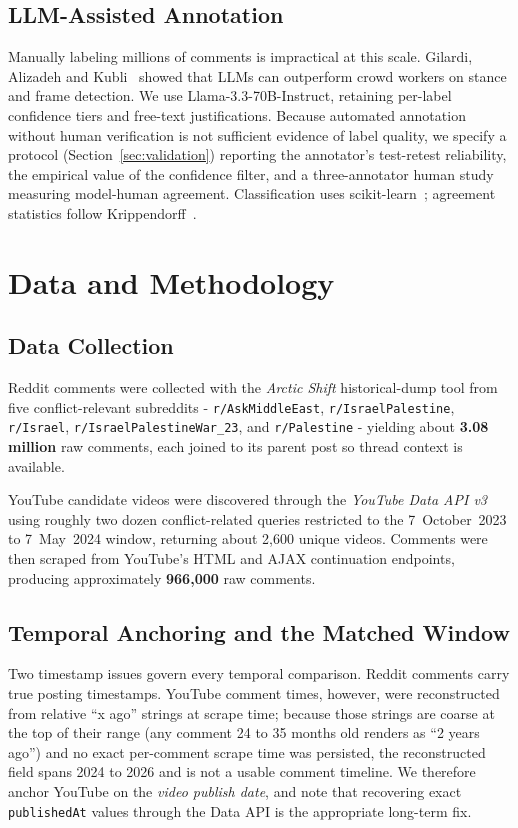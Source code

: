 \documentclass[pdflatex,sn-basic,Numbered,iicol]{sn-jnl}
\begin{document}
\subsection{LLM-Assisted Annotation}
Manually labeling millions of comments is impractical at this scale. Gilardi,
Alizadeh and Kubli~\cite{gilardi2023} showed that LLMs can outperform crowd workers
on stance and frame detection. We use Llama-3.3-70B-Instruct, retaining per-label
confidence tiers and free-text justifications. Because automated annotation without
human verification is not sufficient evidence of label quality, we specify a
protocol (Section~\ref{sec:validation}) reporting the annotator's test-retest reliability, the empirical value of the confidence filter, and a three-annotator human study measuring
model-human agreement.
Classification uses scikit-learn~\cite{pedregosa2011}; agreement statistics follow
Krippendorff~\cite{hayes2007}.

\section{Data and Methodology}
\label{sec:data}
\subsection{Data Collection}
Reddit comments were collected with the \textit{Arctic Shift} historical-dump tool
from five conflict-relevant subreddits - \texttt{r/AskMiddleEast},
\texttt{r/IsraelPalestine}, \texttt{r/Israel}, \texttt{r/IsraelPalestineWar\_23},
and \texttt{r/Palestine} - yielding about \textbf{3.08 million} raw comments, each
joined to its parent post so thread context is available.

YouTube candidate videos were discovered through the \textit{YouTube Data API v3}
using roughly two dozen conflict-related queries restricted to the
7~October~2023 to 7~May~2024 window, returning about 2{,}600 unique videos. Comments
were then scraped from YouTube's HTML and AJAX continuation endpoints, producing
approximately \textbf{966{,}000} raw comments.

\subsection{Temporal Anchoring and the Matched Window}
Two timestamp issues govern every temporal comparison. Reddit comments carry true
posting timestamps. YouTube comment times, however, were reconstructed from relative
``x ago'' strings at scrape time; because those strings are coarse at the top of
their range (any comment 24 to 35 months old renders as ``2 years ago'') and no exact
per-comment scrape time was persisted, the reconstructed field spans 2024 to 2026 and
is not a usable comment timeline. We therefore anchor YouTube on the \emph{video
publish date}, and note that recovering exact \texttt{publishedAt} values through the
Data API is the appropriate long-term fix.
\end{document}
